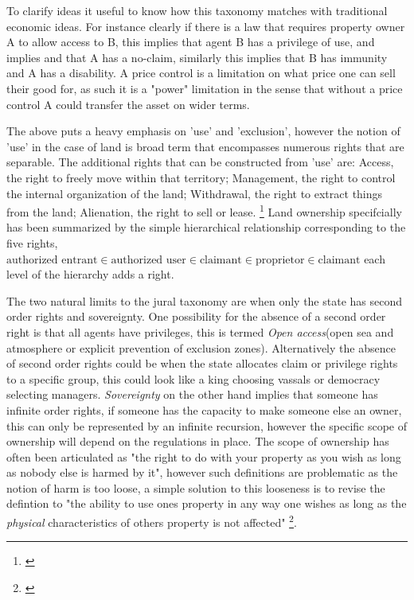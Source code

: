 \documentclass[12pt]{article}
\numberwithin{equation}{section}
\begin{document}
To clarify ideas it useful to know how this taxonomy matches with traditional economic ideas. For instance clearly if there is a law that requires property owner A to allow access to B, this implies that agent B has a privilege of use, and implies and that A has a no-claim, similarly this implies that B has immunity and A has a disability. A price control is a limitation on what price one can sell their good for, as such it is a "power" limitation in the sense that without a price control A could transfer the asset on wider terms.

The above puts a heavy emphasis on 'use' and 'exclusion', however the notion of 'use' in the case of land is broad term that encompasses numerous rights that are separable. The additional rights that can be constructed from 'use' are: Access, the right to freely move within that territory; Management, the right to control the internal organization of the land; Withdrawal, the right to extract things from the land; Alienation, the right to sell or lease. \footnote{\cite{ostrom2010private}}
Land ownership specifcially has been summarized by the simple hierarchical relationship corresponding to the five rights, $\text{authorized entrant} \in \text{authorized user}  \in \text{claimant}  \in \text{proprietor} \in \text{claimant}$ each level of the hierarchy adds a right. \cite{schlager1992property}


The two natural limits to the jural taxonomy are when only the state has second order rights and sovereignty. One possibility for the absence of a second order right is that all agents have privileges, this is termed \textit{Open access}(open sea and atmosphere or explicit prevention of exclusion zones). Alternatively the absence of second order rights could be when the state allocates claim or privilege rights to a specific group, this could look like a king choosing vassals or democracy selecting managers. \textit{Sovereignty} on the other hand implies that someone has infinite order rights, if someone has the capacity to make someone else an owner, this can only be represented by an infinite recursion, however the specific scope of ownership will depend on the regulations in place. The scope of ownership has often been articulated as "the right to do with your property as you wish as long as nobody else is harmed by it", however such definitions are problematic as the notion of harm is too loose, a simple solution to this looseness is to revise the defintion to "the ability to use ones property in any way one wishes as long as the \textit{physical} characteristics of others property is not affected" \footnote{\cite{Alchian1965}}.
\end{document}
